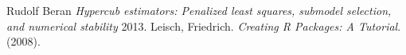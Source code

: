 \documentclass[draft]{article}
\begin{document}


 \begin{thebibliography}{1}
 	 Rudolf Beran {\em Hypercub estimators: Penalized least squares, submodel selection, and numerical stability}  2013.
 	 Leisch, Friedrich. {\em Creating R Packages: A Tutorial}. (2008).
 \end{thebibliography}
 
\end{document}
